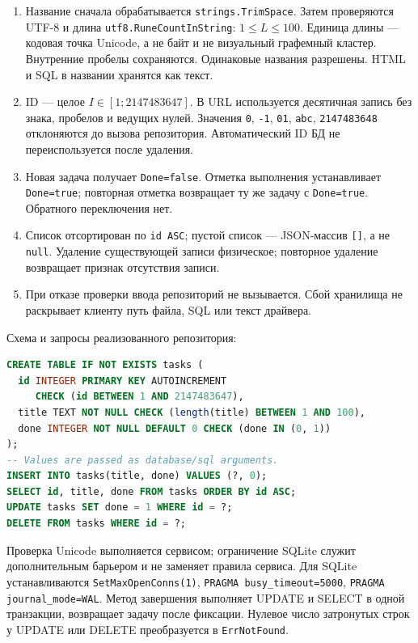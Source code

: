 \documentclass[12pt,a4paper]{extarticle}
\newcommand{\code}[1]{\nolinkurl{#1}}
\begin{document}
\begin{enumerate}
\item Название сначала обрабатывается \code{strings.TrimSpace}.
Затем проверяются UTF-8 и длина \code{utf8.RuneCountInString}:
$1\leq L\leq100$. Единица длины --- кодовая точка Unicode,
а не байт и не визуальный графемный кластер. Внутренние пробелы сохраняются.
Одинаковые названия разрешены. HTML и SQL в названии хранятся как текст.
\item ID --- целое $I\in[1;2147483647]$. В URL используется десятичная
запись без знака, пробелов и ведущих нулей. Значения \code{0}, \code{-1},
\code{01}, \code{abc}, \code{2147483648} отклоняются до вызова репозитория.
Автоматический ID БД не переиспользуется после удаления.
\item Новая задача получает \code{Done=false}.
Отметка выполнения устанавливает \code{Done=true}; повторная отметка
возвращает ту же задачу с \code{Done=true}. Обратного переключения нет.
\item Список отсортирован по \code{id ASC}; пустой список --- JSON-массив
\code{[]}, а не \code{null}. Удаление существующей записи физическое;
повторное удаление возвращает признак отсутствия записи.
\item При отказе проверки ввода репозиторий не вызывается.
Сбой хранилища не раскрывает клиенту путь файла, SQL или текст драйвера.
\end{enumerate}

Схема и запросы реализованного репозитория:
\begin{lstlisting}[language=SQL]
CREATE TABLE IF NOT EXISTS tasks (
  id INTEGER PRIMARY KEY AUTOINCREMENT
     CHECK (id BETWEEN 1 AND 2147483647),
  title TEXT NOT NULL CHECK (length(title) BETWEEN 1 AND 100),
  done INTEGER NOT NULL DEFAULT 0 CHECK (done IN (0, 1))
);
-- Values are passed as database/sql arguments.
INSERT INTO tasks(title, done) VALUES (?, 0);
SELECT id, title, done FROM tasks ORDER BY id ASC;
UPDATE tasks SET done = 1 WHERE id = ?;
DELETE FROM tasks WHERE id = ?;
\end{lstlisting}

Проверка Unicode выполняется сервисом; ограничение SQLite служит
дополнительным барьером и не заменяет правила сервиса.
Для SQLite устанавливаются \code{SetMaxOpenConns(1)},
\code{PRAGMA busy_timeout=5000}, \code{PRAGMA journal_mode=WAL}.
Метод завершения выполняет UPDATE и SELECT в одной транзакции,
возвращает задачу после фиксации. Нулевое число затронутых строк у UPDATE
или DELETE преобразуется в \code{ErrNotFound}.
\end{document}
